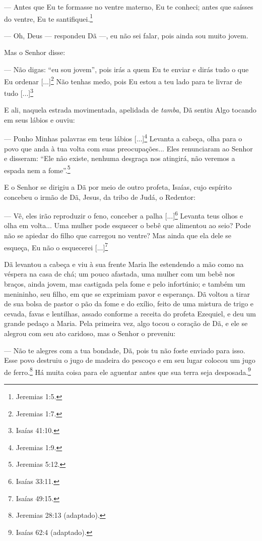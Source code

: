 --- Antes que Eu te formasse no ventre materno, Eu te conheci; antes que
saísses do ventre, Eu te santifiquei.\footnote{Jeremias 1:5.}

--- Oh, Deus --- respondeu Dã ---, eu não sei falar, pois ainda sou
muito jovem.

Mas o Senhor disse:

--- Não digas: ``eu sou jovem'', pois irás a quem Eu te enviar e dirás
tudo o que Eu ordenar {[}...{]}\footnote{Jeremias 1:7.} Não tenhas medo,
pois Eu estou a teu lado para te livrar de tudo {[}...{]}\footnote{Isaías
  41:10.}

E ali, naquela estrada movimentada, apelidada de \emph{tamba}, Dã sentiu
Algo tocando em seus lábios e ouviu:

--- Ponho Minhas palavras em teus lábios {[}...{]}\footnote{Jeremias
  1:9.} Levanta a cabeça, olha para o povo que anda à tua volta com suas
preocupações... Eles renunciaram ao Senhor e disseram: ``Ele não existe,
nenhuma desgraça nos atingirá, não veremos a espada nem a
fome''.\footnote{Jeremias 5:12.}

E o Senhor se dirigiu a Dã por meio de outro profeta, Isaías, cujo
espírito concebeu o irmão de Dã, Jesus, da tribo de Judá, o Redentor:

--- Vê, eles irão reproduzir o feno, conceber a palha
{[}...{]}\footnote{Isaías 33:11.} Levanta teus olhos e olha em volta...
Uma mulher pode esquecer o bebê que alimentou ao seio? Pode não se
apiedar do filho que carregou no ventre? Mas ainda que ela dele se
esqueça, Eu não o esquecerei {[}...{]}\footnote{Isaías 49:15.}

Dã levantou a cabeça e viu à sua frente Maria lhe estendendo a mão como
na véspera na casa de chá; um pouco afastada, uma mulher com um bebê nos
braços, ainda jovem, mas castigada pela fome e pelo infortúnio; e também
um menininho, seu filho, em que se exprimiam pavor e esperança. Dã
voltou a tirar de sua bolsa de pastor o pão da fome e do exílio, feito
de uma mistura de trigo e cevada, favas e lentilhas, assado conforme a
receita do profeta Ezequiel, e deu um grande pedaço a Maria. Pela
primeira vez, algo tocou o coração de Dã, e ele se alegrou com seu ato
caridoso, mas o Senhor o preveniu:

--- Não te alegres com a tua bondade, Dã, pois tu não foste enviado para
isso. Esse povo destruiu o jugo de madeira do pescoço e em seu lugar
colocou um jugo de ferro.\footnote{Jeremias 28:13 (adaptado).} Há muita
coisa para ele aguentar antes que sua terra seja desposada.\footnote{Isaías
  62:4 (adaptado).}

